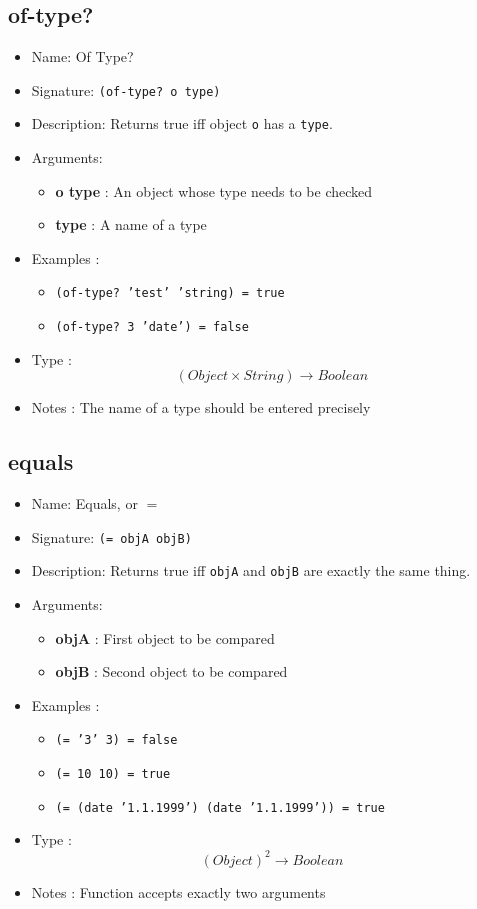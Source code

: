 \subsection{of-type?}
\begin{itemize}
    \item Name: Of Type?
    \item Signature: \texttt{(of-type? o type)}
    \item Description: Returns true iff object \texttt{o} has a \texttt{type}.
    \item Arguments:
        \begin{itemize}
            \item \textbf{o type} : An object whose type needs to be checked
            \item \textbf{type} : A name of a type
        \end{itemize}
    \item Examples :
        \begin{itemize}
            \item \texttt{(of-type? 'test' 'string) = true}
            \item \texttt{(of-type? 3 'date') = false}
        \end{itemize}
    \item Type : \[(Object \times String) \to Boolean\]
    \item Notes : The name of a type should be entered precisely
\end{itemize}

\subsection{equals}
\begin{itemize}
    \item Name: Equals, or $=$
    \item Signature: \texttt{(= objA objB)}
    \item Description: Returns true iff \texttt{objA} and \texttt{objB} are exactly the same thing.
    \item Arguments:
        \begin{itemize}
            \item \textbf{objA} : First object to be compared
            \item \textbf{objB} : Second object to be compared
        \end{itemize}
    \item Examples :
        \begin{itemize}
            \item \texttt{(= '3' 3) = false}
            \item \texttt{(= 10 10) = true}
            \item \texttt{(= (date '1.1.1999') (date '1.1.1999')) = true}
        \end{itemize}
    \item Type : \[(Object)^2 \to Boolean\]
    \item Notes : Function accepts exactly two arguments
\end{itemize}

